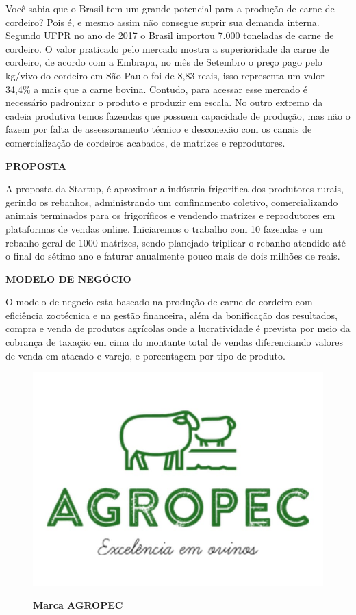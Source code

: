 Você sabia que o Brasil tem um grande potencial para a produção de carne de cordeiro? Pois é, e mesmo assim não consegue suprir 
sua demanda interna. Segundo UFPR no ano de 2017 o Brasil importou 7.000 toneladas de carne de cordeiro. O valor praticado pelo mercado mostra a superioridade da carne de cordeiro, de acordo com a Embrapa, no mês de Setembro o preço pago pelo kg/vivo do cordeiro em São Paulo foi de 8,83 reais, isso representa um valor 34,4\% a mais que a carne 
bovina. Contudo, para acessar esse mercado é necessário padronizar o produto e produzir em escala. No outro extremo da cadeia produtiva temos fazendas que possuem capacidade de produção, mas não o fazem por falta de assessoramento técnico e desconexão com os canais  de comercialização de cordeiros acabados, de matrizes e reprodutores.

\textbf{PROPOSTA}

A proposta da Startup, é aproximar a indústria frigorifica dos  produtores rurais, gerindo os rebanhos, administrando um 
confinamento coletivo, comercializando animais terminados para os frigoríficos e vendendo matrizes e reprodutores em plataformas de vendas online. Iniciaremos o trabalho com 10 fazendas e um rebanho geral de 1000 matrizes, sendo planejado triplicar o rebanho atendido até o final do sétimo ano e faturar anualmente pouco mais de dois milhões de reais.

\textbf{MODELO DE NEGÓCIO}

O modelo de negocio esta baseado na produção de carne de  cordeiro com eficiência zootécnica e na gestão financeira, além 
da bonificação dos resultados, compra e venda de produtos  agrícolas onde a lucratividade é prevista por meio da cobrança de taxação em cima do montante total de vendas diferenciando valores de venda em atacado e varejo, e porcentagem por tipo de produto.


\begin{figure}[!htb]
\centering
\caption{\textbf{Marca AGROPEC}}
\includegraphics[scale=0.2]{Imagens/agropec.jpg}
\label{figura_15}
\end{figure}
\newpage


